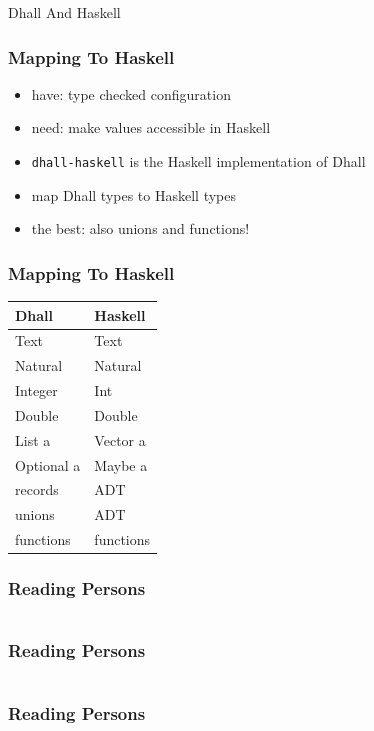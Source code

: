 \documentclass{beamer}
\begin{document}
\begin{frame}
  \begin{center}
    {\Huge Dhall And Haskell}
  \end{center}
\end{frame}

\begin{frame}
  \frametitle{Mapping To Haskell}
  \begin{itemize}
  \item have: type checked configuration
  \item need: make values accessible in Haskell
  \item \texttt{dhall-haskell} is the Haskell implementation of Dhall
  \item map Dhall types to Haskell types
  \item the best: also unions and functions!
  \end{itemize}
\end{frame}

\begin{frame}
  \frametitle{Mapping To Haskell}
  \begin{center}
  \begin{tabular}{l l}
    Dhall & Haskell \\ \hline
    Text & Text \\
    Natural & Natural \\
    Integer & Int \\
    Double & Double \\
    List a & Vector a \\
    Optional a & Maybe a \\
    records & ADT \\
    unions & ADT \\
    functions & functions \\
  \end{tabular}
\end{center}
\end{frame}

\begin{frame}
  \frametitle{Reading Persons}
  \inputminted{text}{dhall/persons/people}
\end{frame}

\begin{frame}
  \frametitle{Reading Persons}
  \inputminted{haskell}{snippets/persons.hs}
\end{frame}

\begin{frame}
  \frametitle{Reading Persons}
  \inputminted{haskell}{snippets/persons-main.hs}
\end{frame}
\end{document}
